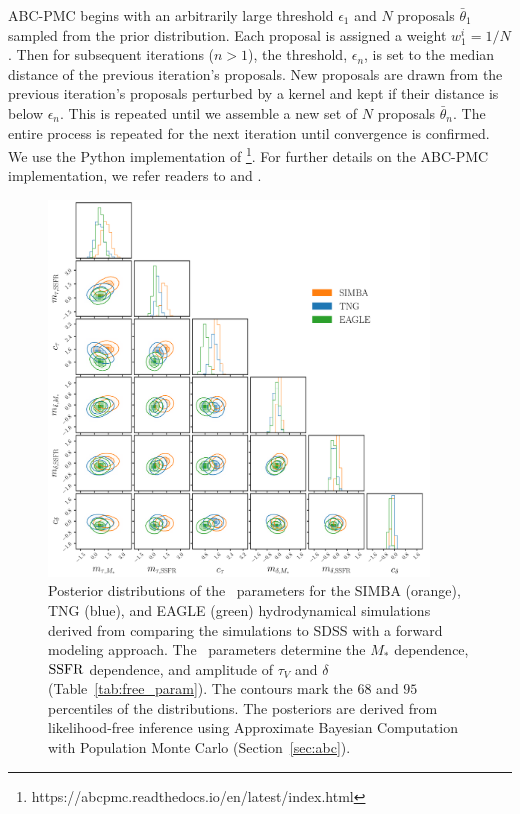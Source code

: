 ABC-PMC begins with an arbitrarily large threshold $\epsilon_1$ and $N$ proposals 
$\bar{\theta}_1$ sampled from the prior distribution. Each proposal is
assigned a weight $w^i_1 = 1/N$. Then for subsequent iterations ($n > 1$), the 
threshold, $\epsilon_n$, is set to the median distance of the previous iteration's
proposals. New proposals are drawn from the previous iteration's proposals perturbed 
by a kernel and kept if their distance is below $\epsilon_n$. This is repeated
until we assemble a new set of $N$ proposals $\bar{\theta}_n$. The entire
process is repeated for the next iteration until convergence is confirmed. 
We use the Python implementation of
\cite{akeret2015}\footnote{https://abcpmc.readthedocs.io/en/latest/index.html}.
For further details on the ABC-PMC implementation, we refer readers to \cite{hahn2017b}
and \cite{hahn2019a}.

\begin{figure}
\begin{center}
    \includegraphics[width=0.9\textwidth]{figs/abc.pdf}
    \caption{\label{fig:abc}
    Posterior distributions of the \eda~parameters for the SIMBA (orange), TNG
    (blue), and EAGLE (green) hydrodynamical simulations derived from comparing
    the simulations to SDSS with a forward modeling approach. 
    The \eda~parameters determine the $M_*$ dependence, ${\rm SSFR}$ dependence, and
    amplitude of $\tau_V$ and $\delta$ (Table~\ref{tab:free_param}). 
    The contours mark the $68$ and $95$ percentiles of the distributions. 
    The posteriors are derived from likelihood-free inference using Approximate
    Bayesian Computation with Population Monte Carlo (Section~\ref{sec:abc}). 
    }
\end{center}
\end{figure}


